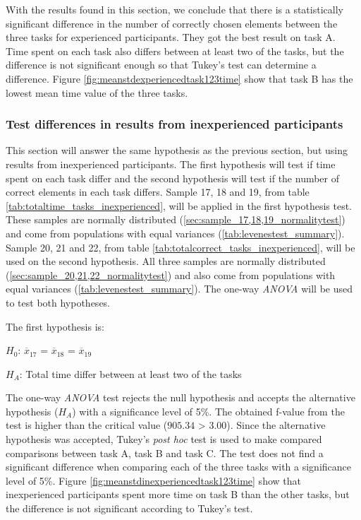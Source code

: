\vspace{0.3cm}

With the results found in this section, we conclude that there is a statistically significant difference in the number of correctly chosen elements between the three tasks for experienced participants. They got the best result on task A. Time spent on each task also differs between at least two of the tasks, but the difference is not significant enough so that Tukey's test can determine a difference. Figure \ref{fig:meanstdexperiencedtask123time} show that task B has the lowest mean time value of the three tasks.  

\subsubsection[Sample 17 -  22]{Test differences in results from inexperienced participants}\label{sec:sample_17_18_19_anova}
This section will answer the same hypothesis as the previous section, but using results from inexperienced participants. The first hypothesis will test if time spent on each task differ and the second hypothesis will test if the number of correct elements in each task differs. Sample 17, 18 and 19, from table \ref{tab:totaltime_tasks_inexperienced}, will be applied in the first hypothesis test. These samples are normally distributed (\ref{sec:sample_17,18,19_normalitytest}) and come from populations with equal variances (\ref{tab:levenestest_summary}). Sample 20, 21 and 22, from table \ref{tab:totalcorrect_tasks_inexperienced}, will be used on the second hypothesis. All three samples are normally distributed (\ref{sec:sample_20,21,22_normalitytest}) and also come from populations with equal variances (\ref{tab:levenestest_summary}). The one-way \textit{ANOVA} will be used to test both hypotheses. 

The first hypothesis is:\\
\centerline{$H_{0}$: $\overline{x}_{17}$ = $\overline{x}_{18}$ = $\overline{x}_{19}$}
\centerline{$H_{A}$: Total time differ between at least two of the tasks}
\vspace{0.2cm}

The one-way \textit{ANOVA} test rejects the null hypothesis and accepts the alternative hypothesis ($H_{A}$) with a significance level of 5\%. The obtained f-value from the test is higher than the critical value ($905.34$ > $3.00$). Since the alternative hypothesis was accepted, Tukey's \textit{post hoc} test is used to make compared comparisons between task A, task B and task C. The test does not find a significant difference when comparing each of the three tasks with a significance level of 5\%. Figure \ref{fig:meanstdinexperiencedtask123time} show that inexperienced participants spent more time on task B than the other tasks, but the difference is not significant according to Tukey's test.

